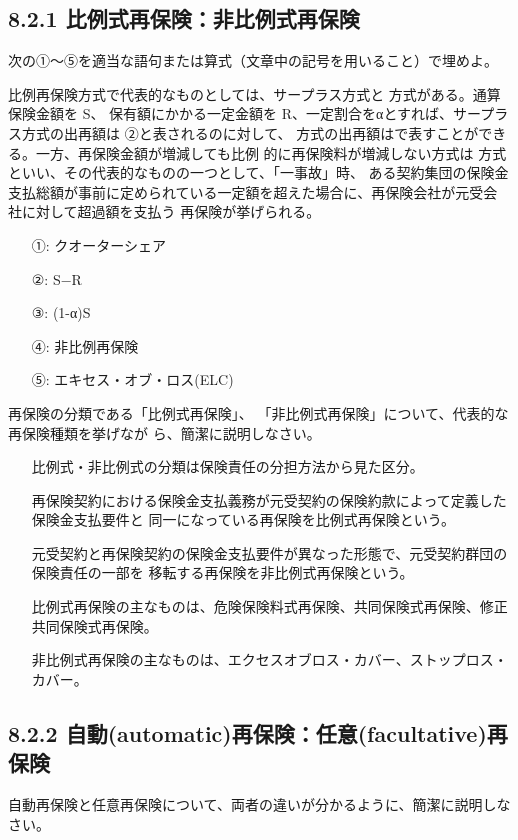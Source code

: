 \documentclass[report,gutter=10mm,fore-edge=10mm,uplatex,dvipdfmx]{jlreq}
\begin{document}
\subsection{8.2.1 比例式再保険：非比例式再保険}
次の①～⑤を適当な語句または算式（文章中の記号を用いること）で埋めよ。

比例再保険方式で代表的なものとしては、サープラス方式と
方式がある。通算保険金額を S、
保有額にかかる一定金額を R、一定割合をαとすれば、サープラス方式の出再額は
②と表されるのに対して、
方式の出再額はで表すことができる。一方、再保険金額が増減しても比例
的に再保険料が増減しない方式は
方式といい、その代表的なものの一つとして、「一事故」時、
ある契約集団の保険金支払総額が事前に定められている一定額を超えた場合に、再保険会社が元受会
社に対して超過額を支払う
再保険が挙げられる。
\answer{}
\begin{itemize}
\item[①: ] クオーターシェア
\item[②: ] S−R
\item[③: ] (1-α)S
\item[④: ] 非比例再保険
\item[⑤: ] エキセス・オブ・ロス(ELC)
\end{itemize}

再保険の分類である「比例式再保険」、
「非比例式再保険」について、代表的な再保険種類を挙げなが
ら、簡潔に説明しなさい。
\answer{}
\begin{itemize}
\item[] 比例式・非比例式の分類は保険責任の分担方法から見た区分。
\item[] 再保険契約における保険金支払義務が元受契約の保険約款によって定義した保険金支払要件と
同一になっている再保険を比例式再保険という。
\item[] 元受契約と再保険契約の保険金支払要件が異なった形態で、元受契約群団の保険責任の一部を
移転する再保険を非比例式再保険という。
\item[] 比例式再保険の主なものは、危険保険料式再保険、共同保険式再保険、修正共同保険式再保険。
\item[] 非比例式再保険の主なものは、エクセスオブロス・カバー、ストップロス・カバー。
\end{itemize}

\subsection{8.2.2 自動(automatic)再保険：任意(facultative)再保険}
自動再保険と任意再保険について、両者の違いが分かるように、簡潔に説明しなさい。
\end{document}
